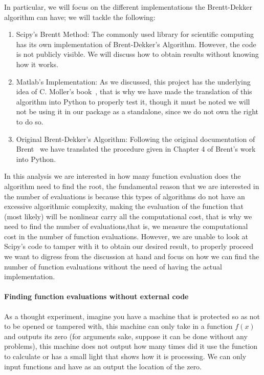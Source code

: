 In particular, we will focus on the different implementations the Brentt-Dekker algorithm can have; we will tackle the following:
\begin{enumerate}
    \item Scipy's Brentt Method: The commonly used library for scientific computing has its own implementation of Brent-Dekker's Algorithm. However, the code is not publicly visible. We will discuss how to obtain results without knowing how it works.
    \item Matlab's Implementation: As we discussed, this project has the underlying idea of C. Moller's book~\cite{doi:10.1137/1.9780898717952}, that is why we have made the translation of this algorithm into Python to properly test it, though it must be noted we will not be using it in our package as a standalone, since we do not own the right to do so.
    \item Original Brent-Dekker's Algorithm: Following the original documentation of Brent~\cite{brent2002algorithms} we have translated the procedure given in Chapter 4 of Brent's work into Python.
\end{enumerate}

In this analysis we are interested in how many function evaluation does the algorithm need to find the root, the fundamental reason that we are interested in the number of evaluations is because this types of algorithms do not have an excessive algorithmic complexity, making the evaluation of the function that (most likely) will be nonlinear carry all the computational cost, that is why we need to find the number of evaluations,that is, we measure the computational cost in the number of function evaluations. However, we are unable to look at Scipy's code to tamper with it to obtain our desired result, to properly proceed we want to digress from the discussion at hand and focus on how we can find the number of function evaluations without the need of having the actual implementation.

\paragraph{Finding function evaluations without external code} As a thought experiment, imagine you have a machine that is protected so as not to be opened or tampered with, this machine can only take in a function $f(x)$ and outputs its zero (for arguments sake, suppose it can be done without any problems), this machine does not output how many times did it use the function to calculate or has a small light that shows how it is processing. We can only input functions and have as an output the location of the zero. 




